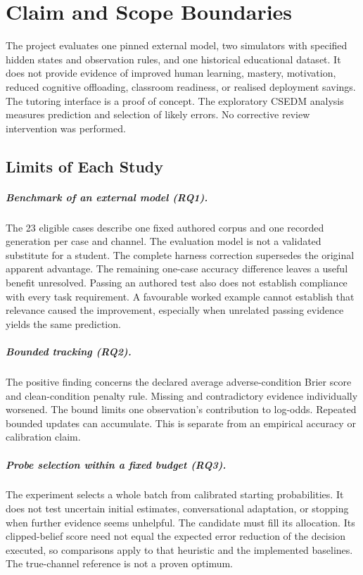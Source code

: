 \chapter{Claim and Scope Boundaries}
\label{app:claims}

The project evaluates one pinned external model, two simulators with specified hidden states and observation rules, and one historical educational dataset. It does
not provide evidence of improved human learning, mastery, motivation, reduced cognitive offloading, classroom readiness, or
realised deployment savings. The tutoring interface is a proof of concept. The exploratory CSEDM analysis measures prediction
and selection of likely errors. No corrective review intervention was performed.

\section{Limits of Each Study}

\paragraph{Benchmark of an external model (RQ1).}
The 23 eligible cases describe one fixed authored corpus and one recorded generation per case and channel. The evaluation model
is not a validated substitute for a student. The complete harness correction supersedes the original apparent advantage.
The remaining one-case accuracy difference leaves a useful benefit unresolved.
Passing an authored test also does not establish compliance with every task requirement. A favourable worked example cannot
establish that relevance caused the improvement, especially when unrelated passing evidence yields the same prediction.

\paragraph{Bounded tracking (RQ2).}
The positive finding concerns the declared average adverse-condition Brier score and clean-condition penalty rule. Missing and
contradictory evidence individually worsened. The bound limits one observation's contribution to log-odds. Repeated bounded
updates can accumulate. This is separate from an empirical accuracy or calibration claim.

\paragraph{Probe selection within a fixed budget (RQ3).}
The experiment selects a whole batch from calibrated starting probabilities. It does not test uncertain initial estimates,
conversational adaptation, or stopping when further evidence seems unhelpful. The candidate must fill its allocation.
Its clipped-belief score need not equal the expected error reduction of the decision executed, so comparisons apply to that
heuristic and the implemented baselines. The true-channel reference is not a proven optimum.

